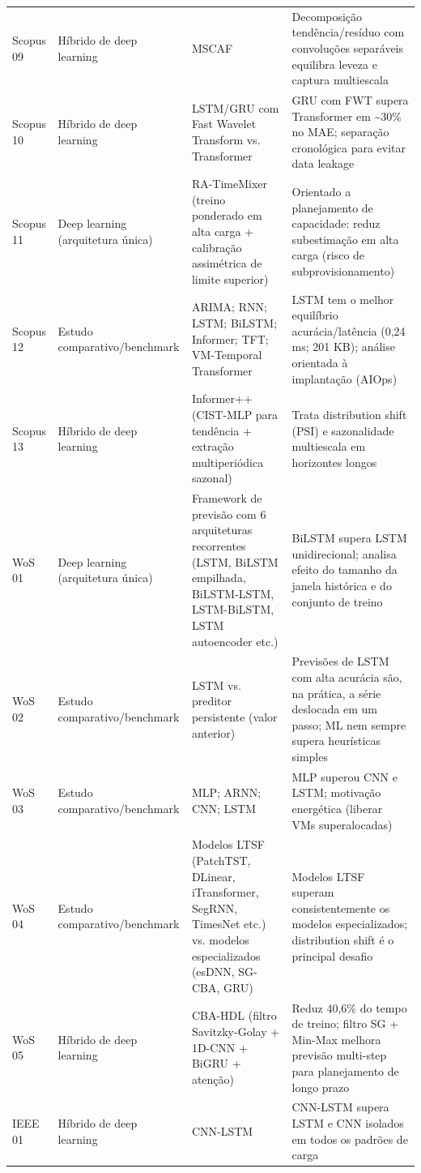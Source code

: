 {\begin{longtable}{p{1.3cm}p{2.6cm}p{5.0cm}p{5.9cm}}
Scopus 09 & Híbrido de deep learning & MSCAF & Decomposição tendência/resíduo com convoluções separáveis equilibra leveza e captura multiescala \\
Scopus 10 & Híbrido de deep learning & LSTM/GRU com Fast Wavelet Transform vs. Transformer & GRU com FWT supera Transformer em \textasciitilde{}30\% no MAE; separação cronológica para evitar data leakage \\
Scopus 11 & Deep learning (arquitetura única) & RA-TimeMixer (treino ponderado em alta carga + calibração assimétrica de limite superior) & Orientado a planejamento de capacidade: reduz subestimação em alta carga (risco de subprovisionamento) \\
Scopus 12 & Estudo comparativo/benchmark & ARIMA; RNN; LSTM; BiLSTM; Informer; TFT; VM-Temporal Transformer & LSTM tem o melhor equilíbrio acurácia/latência (0,24 ms; 201 KB); análise orientada à implantação (AIOps) \\
Scopus 13 & Híbrido de deep learning & Informer++ (CIST-MLP para tendência + extração multiperiódica sazonal) & Trata distribution shift (PSI) e sazonalidade multiescala em horizontes longos \\
WoS 01 & Deep learning (arquitetura única) & Framework de previsão com 6 arquiteturas recorrentes (LSTM, BiLSTM empilhada, BiLSTM-LSTM, LSTM-BiLSTM, LSTM autoencoder etc.) & BiLSTM supera LSTM unidirecional; analisa efeito do tamanho da janela histórica e do conjunto de treino \\
WoS 02 & Estudo comparativo/benchmark & LSTM vs. preditor persistente (valor anterior) & Previsões de LSTM com alta acurácia são, na prática, a série deslocada em um passo; ML nem sempre supera heurísticas simples \\
WoS 03 & Estudo comparativo/benchmark & MLP; ARNN; CNN; LSTM & MLP superou CNN e LSTM; motivação energética (liberar VMs superalocadas) \\
WoS 04 & Estudo comparativo/benchmark & Modelos LTSF (PatchTST, DLinear, iTransformer, SegRNN, TimesNet etc.) vs. modelos especializados (esDNN, SG-CBA, GRU) & Modelos LTSF superam consistentemente os modelos especializados; distribution shift é o principal desafio \\
WoS 05 & Híbrido de deep learning & CBA-HDL (filtro Savitzky-Golay + 1D-CNN + BiGRU + atenção) & Reduz 40,6\% do tempo de treino; filtro SG + Min-Max melhora previsão multi-step para planejamento de longo prazo \\
IEEE 01 & Híbrido de deep learning & CNN-LSTM & CNN-LSTM supera LSTM e CNN isolados em todos os padrões de carga \\

\end{longtable}}
